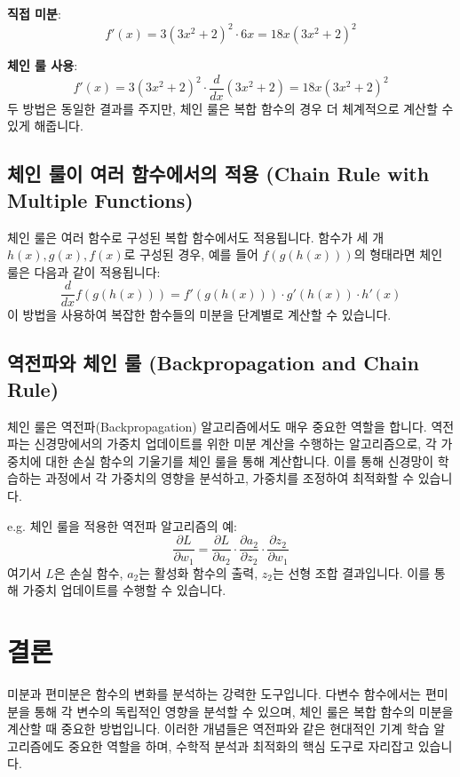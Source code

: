 \documentclass[12pt]{article}
\begin{document}
\textbf{직접 미분}:
\[
  f'(x) = 3(3x^2 + 2)^2 \cdot 6x = 18x(3x^2 + 2)^2
\]

\textbf{체인 룰 사용}:
\[
  f'(x) = 3(3x^2 + 2)^2 \cdot \frac{d}{dx}(3x^2 + 2) = 18x(3x^2 + 2)^2
\]
두 방법은 동일한 결과를 주지만, 체인 룰은 복합 함수의 경우 더 체계적으로 계산할 수 있게 해줍니다.

\subsection{체인 룰이 여러 함수에서의 적용 (Chain Rule with Multiple Functions)}

\noindent 체인 룰은 여러 함수로 구성된 복합 함수에서도 적용됩니다. 함수가 세 개 \( h(x), g(x), f(x) \)로 구성된 경우, 예를 들어 \( f(g(h(x))) \)의 형태라면 체인 룰은 다음과 같이 적용됩니다:
\[
  \frac{d}{dx}f(g(h(x))) = f'(g(h(x))) \cdot g'(h(x)) \cdot h'(x)
\]
이 방법을 사용하여 복잡한 함수들의 미분을 단계별로 계산할 수 있습니다.

\subsection{역전파와 체인 룰 (Backpropagation and Chain Rule)}

\noindent 체인 룰은 역전파(Backpropagation) 알고리즘에서도 매우 중요한 역할을 합니다. 역전파는 신경망에서의 가중치 업데이트를 위한 미분 계산을 수행하는 알고리즘으로, 각 가중치에 대한 손실 함수의 기울기를 체인 룰을 통해 계산합니다. 이를 통해 신경망이 학습하는 과정에서 각 가중치의 영향을 분석하고, 가중치를 조정하여 최적화할 수 있습니다.

\vspace{2\baselineskip}
\noindent {} e.g. 체인 룰을 적용한 역전파 알고리즘의 예:
\[
  \frac{\partial L}{\partial w_1} = \frac{\partial L}{\partial a_2} \cdot \frac{\partial a_2}{\partial z_2} \cdot \frac{\partial z_2}{\partial w_1}
\]
여기서 \( L \)은 손실 함수, \( a_2 \)는 활성화 함수의 출력, \( z_2 \)는 선형 조합 결과입니다. 이를 통해 가중치 업데이트를 수행할 수 있습니다.

\section{결론}

\noindent 미분과 편미분은 함수의 변화를 분석하는 강력한 도구입니다. 다변수 함수에서는 편미분을 통해 각 변수의 독립적인 영향을 분석할 수 있으며, 체인 룰은 복합 함수의 미분을 계산할 때 중요한 방법입니다. 이러한 개념들은 역전파와 같은 현대적인 기계 학습 알고리즘에도 중요한 역할을 하며, 수학적 분석과 최적화의 핵심 도구로 자리잡고 있습니다.
\end{document}

